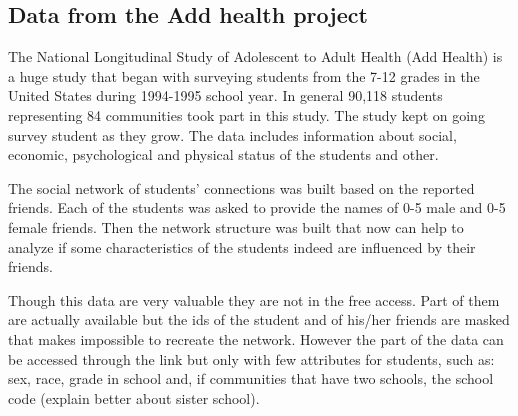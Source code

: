 \documentclass[12pt]{report}
\begin{document}
\subsection{Data from the Add health project}

The National Longitudinal Study of Adolescent to Adult Health (Add Health) is a huge study that began with surveying students from the 7-12 grades in the United States during 1994-1995 school year. In general 90,118 students representing 84 communities took part in this study. The study kept on going survey student as they grow. The 
data includes information about social, economic, psychological and physical status of the students and other. 

The social network of students' connections was built based on the reported friends. Each of the students was asked to provide the names of 0-5 male and 0-5 female friends. Then the network structure was built that now can help to analyze if some characteristics of the students indeed are influenced by their friends.

Though this data are very valuable they are not in the free access. Part of them are actually available but the ids of the student and of his/her friends are masked that makes impossible to recreate the network. However the part of the data can be accessed through the link \cite{Addhealth2} but only with few attributes for students, such as:  sex, race, grade in school and, if communities that have two schools, the school code (explain better about sister school). 
\end{document}
